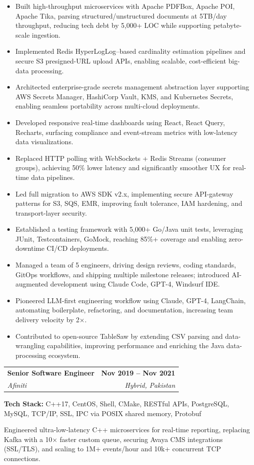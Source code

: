 \documentclass[letterpaper,11pt]{article}
\makeatletter
\newcommand{\resumeItem}[1]{
  \item\small{
    {#1 \vspace{-2pt}}
  }
}
\newcommand{\resumeJobHeading}[4]{
  \vspace{-2pt}\item
    \begin{tabular*}{0.97\textwidth}[t]{l@{\extracolsep{\fill}}r}
      \textbf{#1} & \textbf{#2} \\
      \textit{\small#3} & \textit{\small #4} \\
    \end{tabular*}\vspace{5pt}
}
\newcommand{\resumeItemListStart}{\begin{itemize}}
\newcommand{\resumeItemListEnd}{\end{itemize}\vspace{-5pt}}
\makeatother
\begin{document}
      \resumeItemListStart
        \resumeItem{Built high-throughput microservices with Apache PDFBox, Apache POI, Apache Tika, parsing structured/unstructured documents at 5TB/day throughput, reducing tech debt by 5,000+ LOC while supporting petabyte-scale ingestion.}
        \resumeItem{Implemented Redis HyperLogLog–based cardinality estimation pipelines and secure S3 presigned-URL upload APIs, enabling scalable, cost-efficient big-data processing.}
        \resumeItem{Architected enterprise-grade secrets management abstraction layer supporting AWS Secrets Manager, HashiCorp Vault, KMS, and Kubernetes Secrets, enabling seamless portability across multi-cloud deployments.}
        \resumeItem{Developed responsive real-time dashboards using React, React Query, Recharts, surfacing compliance and event-stream metrics with low-latency data visualizations.}
        \resumeItem{Replaced HTTP polling with WebSockets + Redis Streams (consumer groups), achieving 50\% lower latency and significantly smoother UX for real-time data pipelines.}
        \resumeItem{Led full migration to AWS SDK v2.x, implementing secure API-gateway patterns for S3, SQS, EMR, improving fault tolerance, IAM hardening, and transport-layer security.}
        \resumeItem{Established a testing framework with 5,000+ Go/Java unit tests, leveraging JUnit, Testcontainers, GoMock, reaching 85\%+ coverage and enabling zero-downtime CI/CD deployments.}
        \resumeItem{Managed a team of 5 engineers, driving design reviews, coding standards, GitOps workflows, and shipping multiple milestone releases; introduced AI-augmented development using Claude Code, GPT-4, Windsurf IDE.}
        \resumeItem{Pioneered LLM-first engineering workflow using Claude, GPT-4, LangChain, automating boilerplate, refactoring, and documentation, increasing team delivery velocity by 2×.}
        \resumeItem{Contributed to open-source TableSaw by extending CSV parsing and data-wrangling capabilities, improving performance and enriching the Java data-processing ecosystem.}
      \resumeItemListEnd
      \vspace{10pt}

    \resumeJobHeading
      {Senior Software Engineer}{Nov 2019 -- Nov 2021}
      {Afiniti}{Hybrid, Pakistan}
      
      \textbf{Tech Stack:} C++17, CentOS, Shell, CMake, RESTful APIs, PostgreSQL, MySQL, TCP/IP, SSL, IPC via POSIX shared memory, Protobuf
      
      \vspace{3pt}
      \small{Engineered ultra-low-latency C++ microservices for real-time reporting, replacing Kafka with a 10× faster custom queue, securing Avaya CMS integrations (SSL/TLS), and scaling to 1M+ events/hour and 10k+ concurrent TCP connections.}
      
\end{document}
